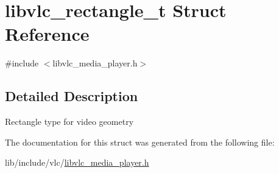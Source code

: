 \hypertarget{structlibvlc__rectangle__t}{}\section{libvlc\+\_\+rectangle\+\_\+t Struct Reference}
\label{structlibvlc__rectangle__t}


{\ttfamily \#include $<$libvlc\+\_\+media\+\_\+player.\+h$>$}



\subsection{Detailed Description}
Rectangle type for video geometry 

The documentation for this struct was generated from the following file\+:\begin{DoxyCompactItemize}
\item 
lib/include/vlc/\hyperlink{libvlc__media__player_8h}{libvlc\+\_\+media\+\_\+player.\+h}\end{DoxyCompactItemize}
